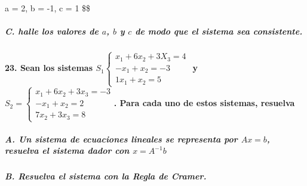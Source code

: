 \documentclass[
]{article}
\begin{document}
\therefore a = 2, b = -1, c = 1 \$\$

\hypertarget{c.-halle-los-valores-de-a-b-y-c-de-modo-que-el-sistema-sea-consistente.}{%
\subparagraph{\texorpdfstring{C. halle los valores de \(a\), \(b\) y
\(c\) de modo que el sistema sea
consistente.}{C. halle los valores de a, b y c de modo que el sistema sea consistente.}}\label{c.-halle-los-valores-de-a-b-y-c-de-modo-que-el-sistema-sea-consistente.}}

\hypertarget{sean-los-sistemas-s_1-begincasesx_16x_23x_34-x_1x_2-31x_1x_25endcases-y-s_2-begincasesx_1-6x_2-3x_3-3-x_1x_227x_23x_38endcases.-para-cada-uno-de-estos-sistemas-resuelva}{%
\paragraph{\texorpdfstring{23. Sean los sistemas
\(S_1 \begin{cases}x_1+6x_2+3X_3=4\\-x_1+x_2=-3\\1x_1+x_2=5\end{cases}\)
y
\(S_2 = \begin{cases}x_1 + 6x_2 + 3x_3=-3\\-x_1+x_2=2\\7x_2+3x_3=8\end{cases}\).
Para cada uno de estos sistemas,
resuelva}{23. Sean los sistemas S\_1 \textbackslash begin\{cases\}x\_1+6x\_2+3X\_3=4\textbackslash\textbackslash-x\_1+x\_2=-3\textbackslash\textbackslash1x\_1+x\_2=5\textbackslash end\{cases\} y S\_2 = \textbackslash begin\{cases\}x\_1 + 6x\_2 + 3x\_3=-3\textbackslash\textbackslash-x\_1+x\_2=2\textbackslash\textbackslash7x\_2+3x\_3=8\textbackslash end\{cases\}. Para cada uno de estos sistemas, resuelva}}\label{sean-los-sistemas-s_1-begincasesx_16x_23x_34-x_1x_2-31x_1x_25endcases-y-s_2-begincasesx_1-6x_2-3x_3-3-x_1x_227x_23x_38endcases.-para-cada-uno-de-estos-sistemas-resuelva}}

\hypertarget{a.-un-sistema-de-ecuaciones-lineales-se-representa-por-ax-b-resuelva-el-sistema-dador-con-x-a-1b}{%
\subparagraph{\texorpdfstring{A. Un sistema de ecuaciones lineales se
representa por \(Ax = b\), resuelva el sistema dador con
\(x = A^{-1}b\)}{A. Un sistema de ecuaciones lineales se representa por Ax = b, resuelva el sistema dador con x = A\^{}\{-1\}b}}\label{a.-un-sistema-de-ecuaciones-lineales-se-representa-por-ax-b-resuelva-el-sistema-dador-con-x-a-1b}}

\hypertarget{b.-resuelva-el-sistema-con-la-regla-de-cramer.}{%
\subparagraph{B. Resuelva el sistema con la Regla de
Cramer.}\label{b.-resuelva-el-sistema-con-la-regla-de-cramer.}}
\end{document}
